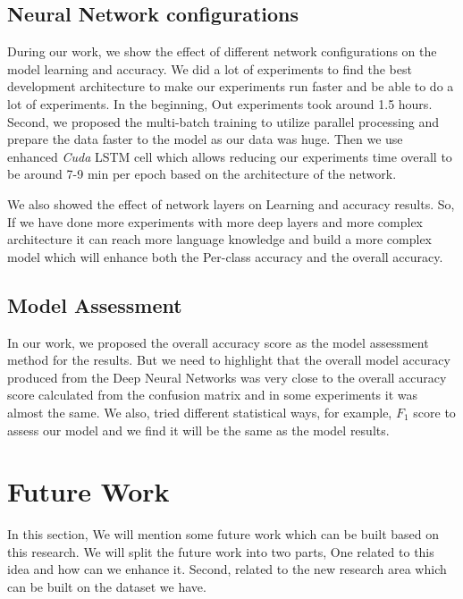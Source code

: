 \subsection{Neural Network configurations}

During our work, we show the effect of different network configurations on the model learning and accuracy. We did a lot of experiments to find the best development architecture to make our experiments run faster and be able to do a lot of experiments. In the beginning, Out experiments took around 1.5 hours. Second, we proposed the multi-batch training to utilize parallel processing and prepare the data faster to the model as our data was huge. Then we use enhanced \textit{Cuda} LSTM cell which allows reducing our experiments time overall to be around 7-9 min per epoch based on the architecture of the network.

We also showed the effect of network layers on Learning and accuracy results. So, If we have done more experiments with more deep layers and more complex architecture it can reach more language knowledge and build a more complex model which will enhance both the Per-class accuracy and the overall accuracy.
\subsection{Model Assessment}

In our work, we proposed the overall accuracy score as the model assessment method for the results. But we need to highlight that the overall model accuracy produced from the Deep Neural Networks was very close to the overall accuracy score calculated from the confusion matrix and in some experiments it was almost the same. We also, tried different statistical ways, for example, $F_1$ score to assess our model and we find it will be the same as the model results.

  \section{Future Work}

  In this section, We will mention some future work which can be built based on this research. We will split the future work into two parts, One related to this idea and how can we enhance it. Second, related to the new research area which can be built on the dataset we have.

